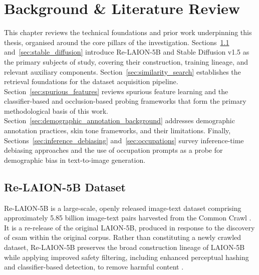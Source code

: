 \graphicspath{{content/chapters/2_background/figures/}}

\chapter{Background \& Literature Review}%
\label{chp:background_lit}

This chapter reviews the technical foundations and prior work underpinning this thesis,
organised around the core pillars of the investigation. Sections~\ref{sec:relaion5b}
and~\ref{sec:stable_diffusion} introduce Re-LAION-5B and Stable Diffusion v1.5 as the
primary subjects of study, covering their construction, training lineage, and relevant
auxiliary components. Section~\ref{sec:similarity_search} establishes the retrieval
foundations for the dataset acquisition pipeline. Section~\ref{sec:spurious_features}
reviews spurious feature learning and the classifier-based and occlusion-based probing
frameworks that form the primary methodological basis of this work.
Section~\ref{sec:demographic_annotation_background} addresses demographic annotation practices,
skin tone frameworks, and their limitations. Finally,
Sections~\ref{sec:inference_debiasing} and~\ref{sec:occupations} survey
inference-time debiasing approaches and the use of occupation prompts as a probe for
demographic bias in text-to-image generation.

\section{Re-LAION-5B Dataset}
\label{sec:relaion5b}

Re-LAION-5B is a large-scale, openly released image-text dataset comprising approximately
5.85 billion image-text pairs harvested from the Common Crawl \cite{Schuhmann_2022_Laion5b, CommonCrawl_2007_CommonCrawl}. It is a re-release of the original LAION-5B, produced in response to the discovery of \acrshort{csam} within the original corpus. Rather than constituting a newly crawled dataset, Re-LAION-5B preserves the broad construction lineage of LAION-5B while applying improved safety filtering, including enhanced perceptual hashing and classifier-based detection, to remove harmful content \cite{Laion_2024_Relaion5B}.

